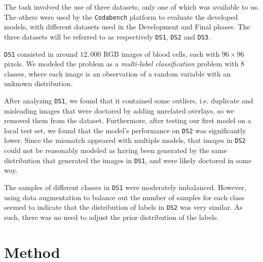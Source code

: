 \documentclass[11pt]{article}
\begin{document}
\begin{multicols}{2}

      The task involved the use of three datasets, only one of which was available to us. The others were used by the \texttt{Codabench}\cite{codabench} platform to evaluate the developed models, with different datasets used in the Development and Final phases. The three datasets will be referred to as respectively \texttt{DS1}, \texttt{DS2} and \texttt{DS3}.

      \texttt{DS1} consisted in around $12,000$ RGB images of blood cells, each with $96 \times 96$ pixels. We modeled the problem as a \textit{multi-label classification} problem with $8$ classes, where each image is an observation of a random variable with an unknown distribution.
      
      After analyzing \texttt{DS1}, we found that it contained some outliers, i.e. duplicate and misleading images that were doctored by adding unrelated overlays, so we removed them from the dataset. Furthermore, after testing our first model on a local test set, we found that the model's performance on \texttt{DS2} was significantly lower. Since the mismatch appeared with multiple models, that images in \texttt{DS2} could not be reasonably modeled as having been generated by the same distribution that generated the images in \texttt{DS1}, and were likely doctored in some way.

      The samples of different classes in \texttt{DS1} were moderately imbalanced. However, using data augmentation to balance out the number of samples for each class seemed to indicate that the distribution of labels in \texttt{DS2} was very similar. As such, there was no need to adjust the prior distribution of the labels.

      \section{Method}


\end{multicols}
\end{document}
